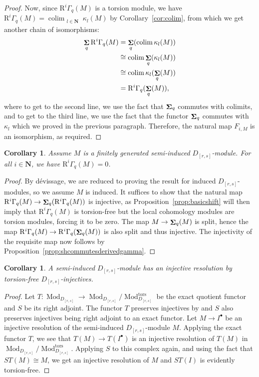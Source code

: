 \documentclass[12pt]{amsart}
\newcommand{\bN}{\mathbf{N}}
\newcommand{\rR}{\mathrm{R}}
\DeclareMathOperator{\Mod}{Mod}
\newcommand{\tors}{\mathrm{tors}}
\DeclareMathOperator{\Sh}{\bf{\Sigma}}
\DeclareMathOperator{\colim}{colim}
\newcommand{\Drs}{D_{[r,s]}}
\newcommand{\mShq}{\Sh_{q}}
\newcommand{\mGaq}{\Gamma_{q}}
\numberwithin{equation}{section}
\newtheorem{corollary}[equation]{Corollary}
\theoremstyle{definition}
\theoremstyle{plain}
\begin{document}
\begin{proof}
 Now, since $\rR^i \mGaq(M)$ is a torsion module, we have $\rR^i\mGaq(M) = \colim_{\substack{l \in \bN}} \kappa_l(M)$ by Corollary~\ref{cor:colim}, from which we get another chain of isomorphisms:
 \begin{align*}
  \mShq \rR^i \mGaq(M) &= \mShq (\colim \kappa_l(M)) \\ 
  & \cong \colim \mShq(\kappa_l(M)) \\
  & \cong \colim \kappa_l(\mShq(M)) \\
  & = \rR^i \mGaq(\mShq(M)),
  \end{align*}
  where to get to the second line, we use the fact that $\mShq$ commutes with colimits, and to get to the third line, we use the fact that the functor $\mShq$ commutes with $\kappa_l$ which we proved in the previous paragraph. Therefore, the natural map $F_{i, M}$ is an isomorphism, as required.
\end{proof}


\begin{corollary}\label{cor:lcvanishing}
  Assume $M$ is a finitely generated semi-induced $\Drs$-module. For all $i\in \bN$, we have $\rR^i \mGaq (M) = 0$.
\end{corollary}
\begin{proof}
By d\'evissage, we are reduced to proving the result for induced $\Drs$-modules, so we assume $M$ is induced.
It suffices to show that the natural map $\rR^i \mGaq(M) \to \mShq(\rR^i\mGaq(M))$ is injective, as Proposition~\ref{prop:basicshift} will then imply that $\rR^i\mGaq(M)$ is torsion-free but the local cohomology modules are torsion modules, forcing it to be zero. The map $M \to \mShq(M)$ is split, hence the map $\rR^i\mGaq(M) \to \rR^i\mGaq(\mShq(M))$ is also split and thus injective. The injectivity of the requisite map now follows by Proposition~\ref{prop:shcommutesderivedgamma}.
\end{proof}

\begin{corollary}\label{cor:semiinj}
   A semi-induced $\Drs$-module has an injective resolution by torsion-free $\Drs$-injectives. 
\end{corollary}
\begin{proof}
    Let $T \colon \Mod_{\Drs} \to \Mod_{\Drs}/\Mod_{\Drs}^{\tors}$ be the exact quotient functor and $S$ be its right adjoint. The functor $T$ preserves injectives by \cite[Proposition~4.3]{ss19gl2} and $S$ also preserves injectives being right adjoint to an exact functor. 
    Let $M \to I^{\bullet}$ be an injective resolution of the semi-induced $\Drs$-module $M$. Applying the exact functor $T$, we see that $T(M) \to T(I^{\bullet})$ is an injective resolution of $T(M)$ in $\Mod_{\Drs}/\Mod_{\Drs}^{\tors}$. Applying $S$ to this complex again, and using the fact that $ST(M) \cong M$, we get an injective resolution of $M$ and $ST(I)$ is evidently torsion-free.
\end{proof}
\end{document}
